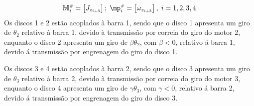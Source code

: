 \documentclass[a4paper,11pt,brazil,fleqn]{article}
\begin{document}
\begin{equation}\label{eq:DiscsModel1}
\mM\ssh_i = \begin{bmatrix} J_{z_{i+3}} \end{bmatrix}; \; \mp\ssh_i = \begin{bmatrix} \omega_{z_{i+3}} \end{bmatrix}, \; i = 1, 2, 3, 4
\end{equation}
Os discos 1 e 2 est\~{a}o acoplados \`{a} barra 1, sendo que o disco 1 apresenta um giro de $\theta_2$ relativo \`{a} barra 1, devido \`{a} transmiss\~{a}o por correia do giro do motor 2, enquanto o disco 2 apresenta um giro de $\beta\theta_2$, com $\beta < 0$, relativo \'{a} barra 1, devido \'{a} transmiss\~{a}o por engrenagem do giro do disco 1.

Os discos 3 e 4 est\~{a}o acoplados \`{a} barra 2, sendo que o disco 3 apresenta um giro de $\theta_3$ relativo \`{a} barra 2, devido \`{a} transmiss\~{a}o por correia do giro do motor 3, enquanto o disco 4 apresenta um giro de $\gamma\theta_3$, com $\gamma < 0$, relativo \'{a} barra 2, devido \'{a} transmiss\~{a}o por engrenagem do giro do disco 3.
\end{document}
